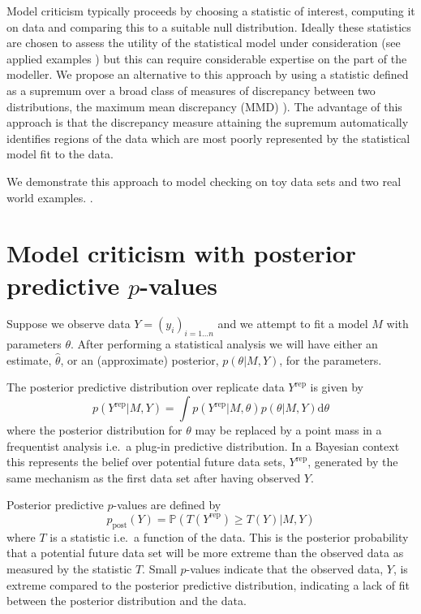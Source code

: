 \documentclass{article} %
\def\ie{i.e.\ }
\begin{document}
Model criticism typically proceeds by choosing a statistic of interest, computing it on data and comparing this to a suitable null distribution.
Ideally these statistics are chosen to assess the utility of the statistical model under consideration (see applied examples \citep[e.g.][]{Meulders1998-xo}) but this can require considerable expertise on the part of the modeller.
We propose an alternative to this approach by using a statistic defined as a supremum over a broad class of measures of discrepancy between two distributions, the maximum mean discrepancy (MMD) \citep[e.g.][]{Gretton2008-ik}).
The advantage of this approach is that the discrepancy measure attaining the supremum automatically identifies regions of the data which are most poorly represented by the statistical model fit to the data.

We demonstrate this approach to model checking on toy data sets and two real world examples.
.

\section{Model criticism with posterior predictive $p$-values}

Suppose we observe data $Y = (y_i)_{i=1\ldots n}$ and we attempt to fit a model $M$ with parameters $\theta$.
After performing a statistical analysis we will have either an estimate, $\hat\theta$, or an (approximate) posterior, $p(\theta|M,Y)$, for the parameters.

The posterior predictive distribution over replicate data $Y^\textrm{rep}$ is given by
\begin{equation}
p(Y^\textrm{rep}|M,Y) = \int p(Y^\textrm{rep}|M,\theta)p(\theta|M,Y)\mathrm{d}\theta
\end{equation}
where the posterior distribution for $\theta$ may be replaced by a point mass in a frequentist analysis \ie a plug-in predictive distribution.
In a Bayesian context this represents the belief over potential future data sets, $Y^\textrm{rep}$, generated by the same mechanism as the first data set after having observed $Y$.

Posterior predictive $p$-values \citep{Rubin1984-tw} are defined by
\begin{equation}
p_\textrm{post}(Y) = \mathbb{P}(T(Y^\textrm{rep})\geq T(Y)|M,Y)
\end{equation}
where $T$ is a statistic \ie a function of the data.
This is the posterior probability that a potential future data set will be more extreme than the observed data as measured by the statistic $T$.
Small $p$-values indicate that the observed data, $Y$, is extreme compared to the posterior predictive distribution, indicating a lack of fit between the posterior distribution and the data.
\end{document}
